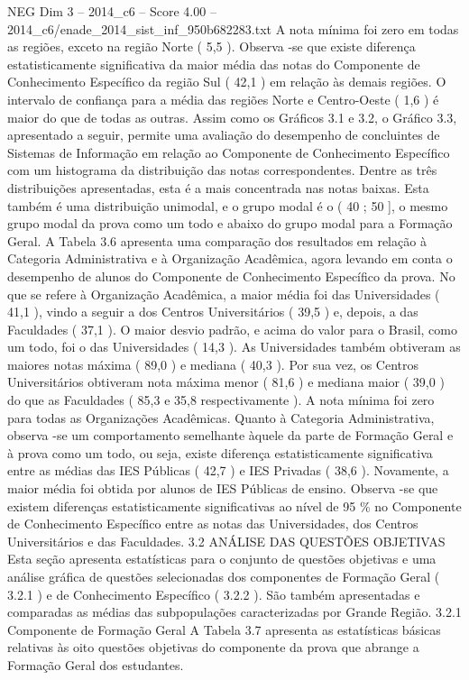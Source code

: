 \begin{textsample}{NEG Dim 3 – 2014\_c6 – Score 4.00 – 2014\_c6/enade\_2014\_sist\_inf\_950b682283.txt}
A nota mínima foi zero em todas as regiões, exceto na região Norte ( 5,5 ).
Observa -se que existe diferença estatisticamente significativa da maior média das notas do Componente de Conhecimento Específico da região Sul ( 42,1 ) em relação às demais regiões.
O intervalo de confiança para a média das regiões Norte e Centro-Oeste ( 1,6 ) é maior do que de todas as outras.
Assim como os Gráficos 3.1 e 3.2, o Gráfico 3.3, apresentado a seguir, permite uma avaliação do desempenho de concluintes de Sistemas de Informação em relação ao Componente de Conhecimento Específico com um histograma da distribuição das notas correspondentes.
Dentre as três distribuições apresentadas, esta é a mais concentrada nas notas baixas.
Esta também é uma distribuição unimodal, e o grupo modal é o ( 40 ; 50 ], o mesmo grupo modal da prova como um todo e abaixo do grupo modal para a Formação Geral.
A Tabela 3.6 apresenta uma comparação dos resultados em relação à Categoria Administrativa e à Organização Acadêmica, agora levando em conta o desempenho de alunos do Componente de Conhecimento Específico da prova.
No que se refere à Organização Acadêmica, a maior média foi das Universidades ( 41,1 ), vindo a seguir a dos Centros Universitários ( 39,5 ) e, depois, a das Faculdades ( 37,1 ).
O maior desvio padrão, e acima do valor para o Brasil, como um todo, foi o das Universidades ( 14,3 ).
As Universidades também obtiveram as maiores notas máxima ( 89,0 ) e mediana ( 40,3 ).
Por sua vez, os Centros Universitários obtiveram nota máxima menor ( 81,6 ) e mediana maior ( 39,0 ) do que as Faculdades ( 85,3 e 35,8 respectivamente ).
A nota mínima foi zero para todas as Organizações Acadêmicas.
Quanto à Categoria Administrativa, observa -se um comportamento semelhante àquele da parte de Formação Geral e à prova como um todo, ou seja, existe diferença estatisticamente significativa entre as médias das IES Públicas ( 42,7 ) e IES Privadas ( 38,6 ).
Novamente, a maior média foi obtida por alunos de IES Públicas de ensino.
Observa -se que existem diferenças estatisticamente significativas ao nível de 95 \% no Componente de Conhecimento Específico entre as notas das Universidades, dos Centros Universitários e das Faculdades. 3.2 ANÁLISE DAS QUESTÕES OBJETIVAS Esta seção apresenta estatísticas para o conjunto de questões objetivas e uma análise gráfica de questões selecionadas dos componentes de Formação Geral ( 3.2.1 ) e de Conhecimento Específico ( 3.2.2 ).
São também apresentadas e comparadas as médias das subpopulações caracterizadas por Grande Região. 3.2.1 Componente de Formação Geral A Tabela 3.7 apresenta as estatísticas básicas relativas às oito questões objetivas do componente da prova que abrange a Formação Geral dos estudantes.

\end{textsample}
